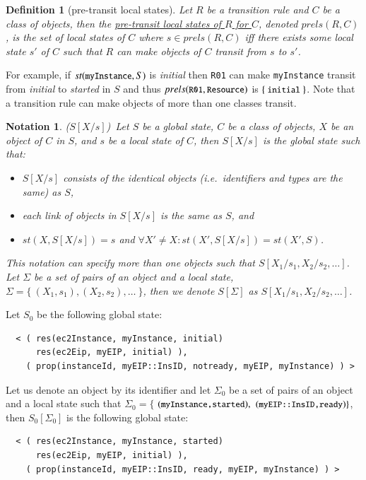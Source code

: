 \documentclass[12pt]{report}
\newtheorem{notation}{Notation}
\newtheorem{definition}{Definition}
\newcommand{\mbstt}[1]{\mbox{\small{\tt {#1}}}}
\newcommand{\stt}[1]{{\small{\tt {#1}}}}
\newcommand{\ul}{\underline}
\begin{document}
\begin{definition}[pre-transit local states]
Let $R$ be a transition rule and $C$ be a class of objects, then
the \ul{pre-transit local states of $R$ for $C$}, denoted
\ul{$prels(R,C)$}, is the set of local states of $C$ where $s \in
prels(R,C)$ iff there exists some local state $s'$ of $C$ such that
$R$ can make objects of $C$ transit from $s$ to $s'$.
\end{definition}
For example, if $st(\mbstt{myInstance},S)$ is {\it initial} then
\stt{R01} can make \stt{myInstance} transit from {\it initial} to {\it
  started} in $S$ and thus $prels(\mbstt{R01},\mbstt{Resource})$ is
$\{~\mbstt{initial}~\}$. Note that a transition rule can make objects
of more than one classes transit.

\begin{notation}($S[X/s]$)\
Let $S$ be a global state, $C$ be a class of objects, $X$ be an object
of $C$ in $S$, and $s$ be a local state of $C$, then
\ul{$S[X/s]$} is the global state such that:
\begin{itemize}
\item $S[X/s]$ consists of the identical objects (i.e.\ identifiers and
  types are the same) as $S$,
\item each link of objects in $S[X/s]$ is the same as $S$, and
\item $st(X,S[X/s])=s$ and $\forall X'\ne X:st(X',S[X/s])=st(X',S)$.
\end{itemize}
This notation can specify more than one objects such that
\ul{$S[X_1/s_1,X_2/s_2,\dots]$}.  Let $\Sigma$ be a set of pairs of
an object and a local state, $\Sigma = \{~ (X_1,s_1), (X_2,s_2), \dots~\}$,
then we denote \ul{$S[\Sigma]$} as $S[X_1/s_1,X_2/s_2,\dots]$.
\end{notation}
Let $S_0$ be the following global state:
\begin{verbatim}
  < ( res(ec2Instance, myInstance, initial)
      res(ec2Eip, myEIP, initial) ),
    ( prop(instanceId, myEIP::InsID, notready, myEIP, myInstance) ) >
\end{verbatim}
Let us denote an object by its identifier and let $\Sigma_0$ be a set
of pairs of an object and a local state such that $\Sigma_0=\{$
$(\mbstt{myInstance,started}),$ $(\mbstt{myEIP::InsID,ready})\}$, then
$S_0[\Sigma_0]$ is the following global state:
\begin{verbatim}
  < ( res(ec2Instance, myInstance, started)
      res(ec2Eip, myEIP, initial) ),
    ( prop(instanceId, myEIP::InsID, ready, myEIP, myInstance) ) >
\end{verbatim}
\end{document}
